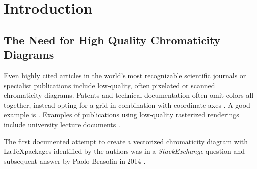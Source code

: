 \documentclass[11pt]{scrbook}
\begin{document}

\section{Introduction}

    \subsection{The Need for High Quality Chromaticity Diagrams}

        Even highly cited articles in the world's most recognizable scientific journals \cite{sun2007bright} or specialist publications \cite{mckittrick2014down} include low-quality, often pixelated or scanned chromaticity diagrams. Patents and technical documentation often omit colors all together, instead opting for a grid in combination with coordinate axes \cite{shimizu1999light}.
        A good example is \cite{doi2012led}. Examples of publications using low-quality rasterized renderings include university lecture documents \cite{univie2020chromaticity}.

The first documented attempt to create a vectorized chromaticity diagram with \LaTeX packages identified by the authors was in a \textit{StackExchange} question and subsequent answer by Paolo Brasolin in 2014 \cite{brasolin2014stackexchange}.



\printbibliography

\end{document}
